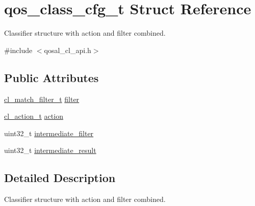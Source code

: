 \hypertarget{structqos__class__cfg__t}{\section{qos\-\_\-class\-\_\-cfg\-\_\-t Struct Reference}
\label{structqos__class__cfg__t}
}


Classifier structure with action and filter combined.  




{\ttfamily \#include $<$qosal\-\_\-cl\-\_\-api.\-h$>$}

\subsection*{Public Attributes}
\begin{DoxyCompactItemize}
\item 
\hyperlink{structcl__match__filter__t}{cl\-\_\-match\-\_\-filter\-\_\-t} \hyperlink{structqos__class__cfg__t_a50dc761ffcaa6824d69e2be6d451b711}{filter}
\item 
\hyperlink{structcl__action__t}{cl\-\_\-action\-\_\-t} \hyperlink{structqos__class__cfg__t_a81b6665d9574605d4a350abf8f073dd2}{action}
\item 
uint32\-\_\-t \hyperlink{structqos__class__cfg__t_a11bf1df252c41444ac62c6f3317bf8b6}{intermediate\-\_\-filter}
\item 
uint32\-\_\-t \hyperlink{structqos__class__cfg__t_a3b386c0054684059ff75ab6a61627d25}{intermediate\-\_\-result}
\end{DoxyCompactItemize}


\subsection{Detailed Description}
Classifier structure with action and filter combined. 

